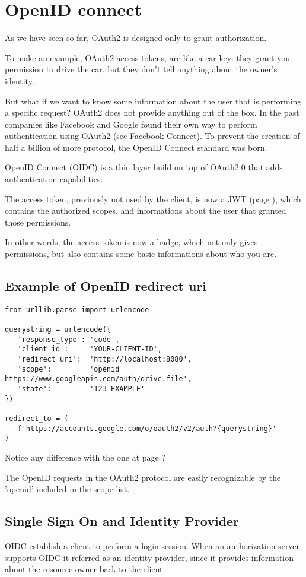 \section{OpenID connect}
\label{openid}
As we have seen so far, OAuth2 is designed only to grant authorization.

To make an example, OAuth2 access tokens, are like a car key: they grant you
permission to drive the car, but they don't tell anything about the owner's
identity.

But what if we want to know some information about the user that is performing a
specific request?
OAuth2 does not provide anything out of the box. In the past companies like
Facebook  and Google found their own way to perform authentication using OAuth2
(see Facebook Connect).
To prevent the creation of half a billion of more protocol, the OpenID Connect
standard was born.


OpenID Connect (OIDC) is a thin layer build on top of OAuth2.0 that adds
authentication capabilities.

The access token, previously not used by the client, is now a JWT (page
\pageref{jwt}), which contains the authorized scopes, and informations about the
user that granted those permissions.

In other words, the access token is now a badge, which not only gives
permissions, but also contains some basic informations about who you are.

\subsection{Example of OpenID redirect uri}

\begin{lstlisting}
from urllib.parse import urlencode

querystring = urlencode({
   'response_type': 'code',
   'client_id':     'YOUR-CLIENT-ID',
   'redirect_uri':  'http://localhost:8080',
   'scope':         'openid https://www.googleapis.com/auth/drive.file',
   'state':         '123-EXAMPLE'
})

redirect_to = (
   f'https://accounts.google.com/o/oauth2/v2/auth?{querystring}'
)
\end{lstlisting}
Notice any difference with the one at page \pageref{lst:authorization-code}?

The OpenID requests in the OAuth2 protocol are easily recognizable by the
'openid' included in the scope list.

\subsection{Single Sign On and Identity Provider}
OIDC establish a client to perform a login session.
When an authorization server supports OIDC it referred as an identity provider,
since it provides information about the resource owner back to the client.

